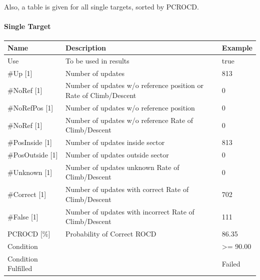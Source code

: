 Also, a table is given for all single targets, sorted by PCROCD.

\paragraph{Single Target}

\begin{center}
 \begin{table}[H]
  \begin{tabularx}{\textwidth}{ | l | X |  l | }
    \hline
    \textbf{Name} & \textbf{Description} & \textbf{Example} \\ \hline
    Use & To be used in results & true \\ \hline
    \#Up [1] & Number of updates & 813 \\ \hline
    \#NoRef [1] & Number of updates w/o reference position or Rate of Climb/Descent & 0 \\ \hline
    \#NoRefPos [1] & Number of updates w/o reference position  & 0 \\ \hline
    \#NoRef [1] & Number of updates w/o reference Rate of Climb/Descent & 0 \\ \hline
    \#PosInside [1] & Number of updates inside sector & 813 \\ \hline
    \#PosOutside [1] & Number of updates outside sector & 0 \\ \hline
    \#Unknown [1] & Number of updates unknown Rate of Climb/Descent & 0 \\ \hline
    \#Correct [1] & Number of updates with correct Rate of Climb/Descent & 702 \\ \hline
    \#False [1] & Number of updates with incorrect Rate of Climb/Descent & 111 \\ \hline
    PCROCD [\%] & Probability of Correct ROCD & 86.35 \\ \hline
    Condition &  & >= 90.00 \\ \hline
    Condition Fulfilled &  & Failed \\ \hline
\end{tabularx}
\end{table}
\end{center}

